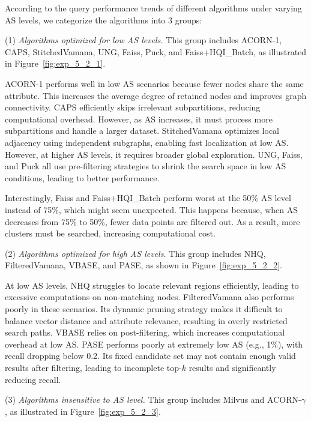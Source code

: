 \documentclass[sigconf, nonacm]{acmart}
\begin{document}
According to the query performance trends of different algorithms under varying AS levels, we categorize the algorithms into 3 groups:

(1) \textit{Algorithms optimized for low AS levels.}  
This group includes ACORN-1, CAPS, StitchedVamana, UNG, Faiss, Puck, and Faiss+HQI\_Batch, as illustrated in Figure~\ref{fig:exp_5_2_1}.

ACORN-1 performs well in low AS scenarios because fewer nodes share the same attribute. This increases the average degree of retained nodes and improves graph connectivity. CAPS efficiently skips irrelevant subpartitions, reducing computational overhead. However, as AS increases, it must process more subpartitions and handle a larger dataset. StitchedVamana optimizes local adjacency using independent subgraphs, enabling fast localization at low AS. However, at higher AS levels, it requires broader global exploration. UNG, Faiss, and Puck all use pre-filtering strategies to shrink the search space in low AS conditions, leading to better performance.

Interestingly, Faiss and Faiss+HQI\_Batch perform worst at the 50\% AS level instead of 75\%, which might seem unexpected. This happens because, when AS decreases from 75\% to 50\%, fewer data points are filtered out. As a result, more clusters must be searched, increasing computational cost.

\par
(2) \textit{Algorithms optimized for high AS levels.}  
This group includes NHQ, FilteredVamana, VBASE, and PASE, as shown in Figure~\ref{fig:exp_5_2_2}.

At low AS levels, NHQ struggles to locate relevant regions efficiently, leading to excessive computations on non-matching nodes. FilteredVamana also performs poorly in these scenarios. Its dynamic pruning strategy makes it difficult to balance vector distance and attribute relevance, resulting in overly restricted search paths.
VBASE relies on post-filtering, which increases computational overhead at low AS. PASE performs poorly at extremely low AS (e.g., 1\%), with recall dropping below 0.2. Its fixed candidate set may not contain enough valid results after filtering, leading to incomplete top-$k$ results and significantly reducing recall.

\par
(3) \textit{Algorithms insensitive to AS level.}  
This group includes Milvus and ACORN-\(\gamma\), as illustrated in Figure~\ref{fig:exp_5_2_3}.
\end{document}
